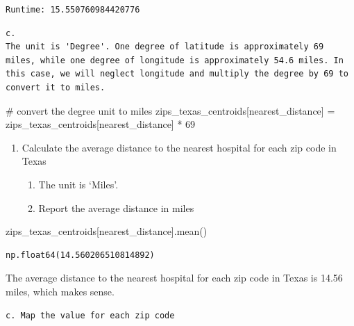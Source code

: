 \documentclass[
  letterpaper,
  DIV=11,
  numbers=noendperiod]{scrartcl}
\newenvironment{Shaded}{\begin{snugshade}}{\end{snugshade}}
\newcommand{\CommentTok}[1]{\textcolor[rgb]{0.37,0.37,0.37}{#1}}
\newcommand{\DecValTok}[1]{\textcolor[rgb]{0.68,0.00,0.00}{#1}}
\newcommand{\NormalTok}[1]{\textcolor[rgb]{0.00,0.23,0.31}{#1}}
\newcommand{\OperatorTok}[1]{\textcolor[rgb]{0.37,0.37,0.37}{#1}}
\newcommand{\StringTok}[1]{\textcolor[rgb]{0.13,0.47,0.30}{#1}}
\begin{document}
\begin{verbatim}
Runtime: 15.550760984420776
\end{verbatim}

\begin{verbatim}
c.
The unit is 'Degree'. One degree of latitude is approximately 69 miles, while one degree of longitude is approximately 54.6 miles. In this case, we will neglect longitude and multiply the degree by 69 to convert it to miles.
\end{verbatim}

\begin{Shaded}
\begin{Highlighting}[]
\CommentTok{\# convert the degree unit to miles}
\NormalTok{zips\_texas\_centroids[}\StringTok{\textquotesingle{}nearest\_distance\textquotesingle{}}\NormalTok{] }\OperatorTok{=}\NormalTok{ zips\_texas\_centroids[}\StringTok{\textquotesingle{}nearest\_distance\textquotesingle{}}\NormalTok{] }\OperatorTok{*} \DecValTok{69}
\end{Highlighting}
\end{Shaded}

\begin{enumerate}
\def\labelenumi{\arabic{enumi}.}
\setcounter{enumi}{4}
\item
  Calculate the average distance to the nearest hospital for each zip
  code in Texas

  \begin{enumerate}
  \def\labelenumii{\alph{enumii}.}
  \item
    The unit is `Miles'.
  \item
    Report the average distance in miles
  \end{enumerate}
\end{enumerate}

\begin{Shaded}
\begin{Highlighting}[]
\NormalTok{zips\_texas\_centroids[}\StringTok{\textquotesingle{}nearest\_distance\textquotesingle{}}\NormalTok{].mean()}
\end{Highlighting}
\end{Shaded}

\begin{verbatim}
np.float64(14.560206510814892)
\end{verbatim}

The average distance to the nearest hospital for each zip code in Texas
is 14.56 miles, which makes sense.

\begin{verbatim}
c. Map the value for each zip code
\end{verbatim}
\end{document}
